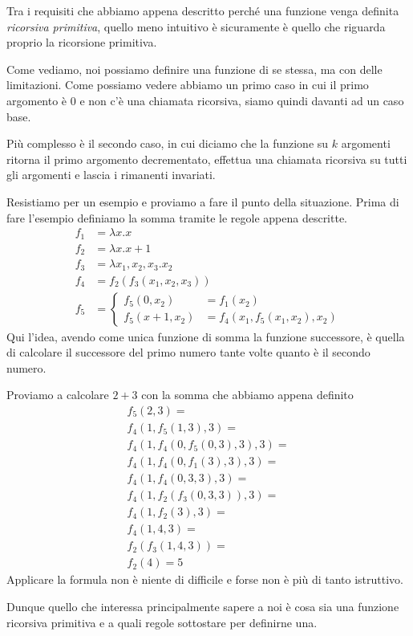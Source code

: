 Tra i requisiti che abbiamo appena descritto perché una
funzione venga definita \emph{ricorsiva primitiva}, quello
meno intuitivo è sicuramente è quello che riguarda proprio
la ricorsione primitiva.

Come vediamo, noi possiamo definire una funzione di se stessa,
ma con delle limitazioni. Come possiamo vedere abbiamo un
primo caso in cui il primo argomento è $0$ e non c'è una
chiamata ricorsiva, siamo quindi davanti ad un caso base.

Più complesso è il secondo caso, in cui diciamo che la funzione
su $k$ argomenti ritorna il primo argomento decrementato,
effettua una chiamata ricorsiva su tutti gli argomenti e lascia
i rimanenti invariati.

Resistiamo per un esempio e proviamo a fare il punto della
situazione. Prima di fare l'esempio definiamo la somma tramite
le regole appena descritte.
\[
	\begin{array}{ll}
		f_1 & = \lambda x.x                    \\
		f_2 & = \lambda x.x + 1                \\
		f_3 & = \lambda x_1, x_2, x_3 . x_2    \\
		f_4 & = f_2 (f_3 (x_1, x_2, x_3))      \\
		f_5 & = \begin{cases}
			        f_5 (0, x_2)     & = f_1 (x_2) \\
			        f_5 (x + 1, x_2) & =
			        f_4 (x_1, f_5(x_1, x_2), x_2)
		        \end{cases}
	\end{array}
\]
Qui l'idea, avendo come unica funzione di somma la funzione
successore, è quella di calcolare il successore del primo
numero tante volte quanto è il secondo numero.

\begin{example}
	Proviamo a calcolare $2 + 3$ con la somma che abbiamo
	appena definito
	\[
		\begin{array}{l}
			f_5(2, 3) =                         \\
			f_4 (1, f_5(1, 3), 3) =             \\
			f_4 (1, f_4(0, f_5 (0, 3), 3), 3) = \\
			f_4 (1, f_4(0, f_1 (3), 3), 3) =    \\
			f_4 (1, f_4(0, 3, 3), 3) =          \\
			f_4 (1, f_2(f_3(0, 3, 3)), 3) =     \\
			f_4 (1, f_2(3), 3) =                \\
			f_4 (1, 4, 3) =                     \\
			f_2 (f_3 (1, 4, 3)) =               \\
			f_2 (4) = 5
		\end{array}
	\]
	Applicare la formula non è niente di difficile e forse
	non è più di tanto istruttivo.
\end{example}

Dunque quello che interessa principalmente sapere a noi è 
cosa sia una funzione ricorsiva primitiva e a quali regole 
sottostare per definirne una.

